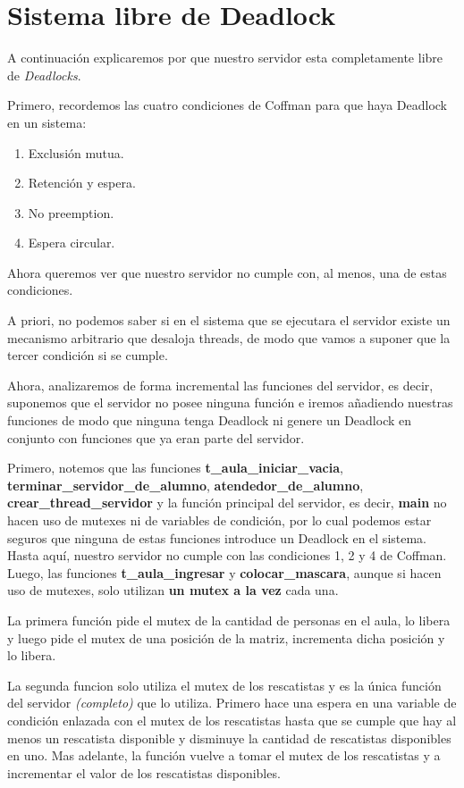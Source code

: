 \section{Sistema libre de Deadlock}

A continuación explicaremos por que nuestro servidor esta completamente libre de \textit{Deadlocks}.

Primero, recordemos las cuatro condiciones de Coffman para que haya Deadlock en un sistema:
\begin{enumerate}
	\item Exclusión mutua.
	\item Retención y espera.
	\item No preemption.
	\item Espera circular.
\end{enumerate}

Ahora queremos ver que nuestro servidor no cumple con, al menos, una de estas condiciones.

A priori, no podemos saber si en el sistema que se ejecutara el servidor existe un mecanismo arbitrario que desaloja threads, de modo que vamos a suponer que la tercer condición si se cumple.

Ahora, analizaremos de forma incremental las funciones del servidor, es decir, suponemos que el servidor no posee ninguna función e iremos añadiendo nuestras funciones de modo que ninguna tenga Deadlock ni genere un Deadlock en conjunto con funciones que ya eran parte del servidor.

Primero, notemos que las funciones \textbf{t\_aula\_iniciar\_vacia}, \textbf{terminar\_servidor\_de\_alumno}, \textbf{atendedor\_de\_alumno}, \textbf{crear\_thread\_servidor} y la función principal del servidor, es decir, \textbf{main} no hacen uso de mutexes ni de variables de condición, por lo cual podemos estar seguros que ninguna de estas funciones introduce un Deadlock en el sistema.\\
Hasta aquí, nuestro servidor no cumple con las condiciones 1, 2 y 4 de Coffman.\\


Luego, las funciones \textbf{t\_aula\_ingresar} y \textbf{colocar\_mascara}, aunque si hacen uso de mutexes, solo utilizan \textbf{un mutex a la vez} cada una.

La primera función pide el mutex de la cantidad de personas en el aula, lo libera y luego pide el mutex de una posición de la matriz, incrementa dicha posición y lo libera.

La segunda funcion solo utiliza el mutex de los rescatistas y es la única función del servidor \textit{(completo)} que lo utiliza. Primero hace una espera en una variable de condición enlazada con el mutex de los rescatistas hasta que se cumple que hay al menos un rescatista disponible y disminuye la cantidad de rescatistas disponibles en uno. Mas adelante, la función vuelve a tomar el mutex  de los rescatistas y a incrementar el valor de los rescatistas disponibles.\\

